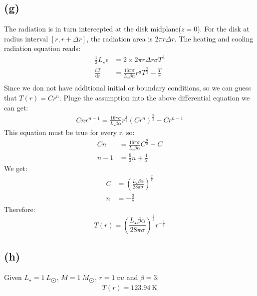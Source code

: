 \documentclass[a4paper,12pt]{article}
\renewcommand{\d}{\mathrm{d}}
\begin{document}
\subsection*{(g)}
The radiation is in turn intercepted at the disk midplane($z=0$). For the disk at radius interval $[r, r + \Delta r]$, 
the radiation area is $2\pi r \Delta r$. The heating and cooling radiation equation reads:
\begin{align*}
    \frac{1}{2} L_\star \epsilon &= 2 \times 2\pi r \Delta r \sigma T^4 \\
    \frac{\d T}{\d r} &= \frac{16 \pi \sigma}{L_\star \beta \alpha} r^{\frac{1}{2}} T^{\frac{9}{2}} - \frac{T}{r} \\
\end{align*}
Since we don not have additional initial or boundary conditions, so we can guess that $T(r) = C r^{n}$.
Pluge the assumption into the above differential equation we can get:
\begin{align*}
    Cn r^{n-1} = \frac{16 \pi \sigma}{L_\star \beta \alpha} r^{\frac{1}{2}} (Cr^n)^{\frac{9}{2}} - C r^{n-1}
\end{align*}
This equation must be true for every r, so:
\begin{align*}
    Cn &= \frac{16 \pi \sigma}{L_\star \beta \alpha} C^{\frac{9}{2}} - C \\
    n - 1 &= \frac{9}{2} n + \frac{1}{2}
\end{align*}
We get:
\begin{align*}
    C &= (\frac{L_\star \beta \alpha}{28 \pi \sigma})^{\frac{2}{7}}\\
    n &= -\frac{3}{7}
\end{align*}
Therefore:
\begin{equation*}
    T(r) = (\frac{L_\star \beta \alpha}{28 \pi \sigma})^{\frac{2}{7}} r^{-\frac{3}{7}}
\end{equation*}



\subsection*{(h)}
Given $L_\star = 1 \ L_{\bigodot}$, $M = 1 \ M_{\bigodot}$, $r = 1\ au$ and $\beta =3$:
\begin{align*}
    T(r) = 123.94 \ \text{K}
\end{align*}
\end{document}
